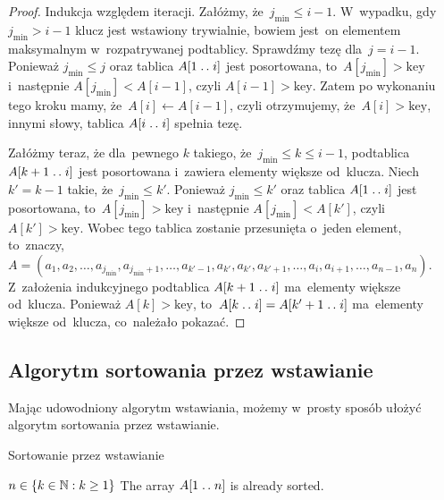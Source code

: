 \begin{proof}
    Indukcja względem iteracji.
    Załóżmy, że~\( j_{\text{min}} \le i - 1 \). W~wypadku,
    gdy~\( j_{\text{min}} > i - 1 \) klucz jest wstawiony trywialnie,
    bowiem jest~on elementem maksymalnym w~rozpatrywanej podtablicy.
    Sprawdźmy tezę dla~\( j = i - 1 \). 
    Ponieważ \( j_{\text{min}} \le j \)
    oraz tablica \( A[1 \mathrel{{.}\,{.}}\nobreak i] \) jest posortowana, 
    to~\( A[j_{\text{min}}] > \text{key} \) i~następnie
    \( A[j_{\text{min}}] < A[i - 1] \), 
    czyli \( A[i - 1] > \text{key} \). 
    Zatem po wykonaniu tego kroku mamy, że~\( A[i] \gets A[i - 1] \),
    czyli otrzymujemy, że~\( A[i] > \text{key} \),
    innymi słowy, tablica \( A[i \mathrel{{.}\,{.}}\nobreak i] \) spełnia tezę.
    
    Załóżmy teraz, że dla~pewnego \( k \) takiego, 
    że~\( j_{\text{min}} \le k \le i - 1 \),
    podtablica \( A[ k + 1 \mathrel{{.}\,{.}}\nobreak i ] \)
    jest posortowana i~zawiera elementy większe od~klucza.
    Niech \( k' = k - 1 \) takie, że~\( j_{\text{min}} \le k' \).
    Ponieważ \( j_{\text{min}} \le k' \) 
    oraz tablica \( A[1 \mathrel{{.}\,{.}}\nobreak i] \) jest posortowana, 
    to~\( A[j_{\text{min}}] > \text{key} \) i~następnie
    \( A[j_{\text{min}}] < A[k'] \), czyli 
    \( A[k'] > \text{key} \). Wobec tego tablica zostanie przesunięta
    o~jeden element, to~znaczy, 
    \( A = (a_1, a_2, \dotsc, a_{j_{\text{min}}},
    a_{j_{\text{min}} + 1}, \dotsc, 
    a_{k' - 1}, a_{k'}, a_{k'}, a_{k' + 1},
    \dotsc, a_{i}, a_{i + 1}, \dotsc, a_{n - 1}, a_n) \).
    Z~założenia indukcyjnego podtablica \( A[k + 1 \mathrel{{.}\,{.}}\nobreak i] \)
    ma~elementy większe od~klucza.
    Ponieważ \( A[k] > \text{key} \), to~\( A[k \mathrel{{.}\,{.}}\nobreak i] 
    = A[k' + 1 \mathrel{{.}\,{.}}\nobreak i] \)
    ma~elementy większe od~klucza, co~należało pokazać.
\end{proof}

\subsection{Algorytm sortowania przez wstawianie}
Mając udowodniony algorytm wstawiania, możemy w~prosty sposób
ułożyć algorytm sortowania przez wstawianie.

\begin{algorithm}%
    \label{alg:insertion-sort}
    \caption{Sortowanie przez wstawianie}
    \begin{algorithmic}[1]
        \Require \( n \in \{ k \in \mathbb{N} : k \ge 1 \} \)
        \Ensure The array \( A[1 \mathrel{{.}\,{.}}\nobreak n] \) is already sorted.
            \EndFor
        \EndProcedure%
    \end{algorithmic}
\end{algorithm}

